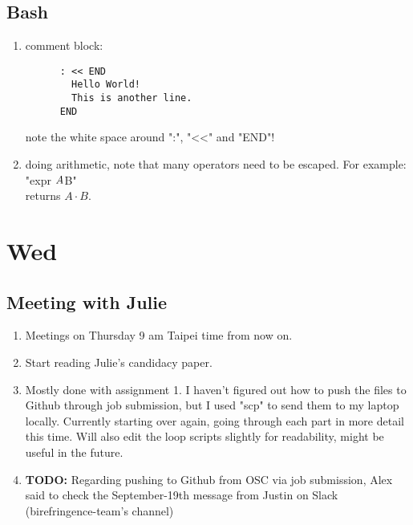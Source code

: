 \documentclass[12pt,letterpaper]{article}
\begin{document}
\subsection{Bash}
\begin{enumerate}
  \item comment block:
    \begin{verbatim}
      : << END
        Hello World!
        This is another line.
      END
    \end{verbatim}
    note the white space around ":", "<<" and "END"!

  \item doing arithmetic, note that many operators need to be escaped. For example:\\
    "expr $A \* $B"\\
    returns $A\cdot B$.
    
\end{enumerate}


\section{Wed}
\subsection{Meeting with Julie}
\begin{enumerate}
  \item Meetings on Thursday 9 am Taipei time from now on.
  \item Start reading Julie's candidacy paper.
  \item Mostly done with assignment 1. I haven't figured out how to push the files
    to Github through job submission, but I used "scp" to send them to my laptop
    locally. Currently starting over again, going through each part in more detail
    this time. Will also edit the loop scripts slightly for readability, might be 
    useful in the future.
  \item \textbf{TODO:} 
    Regarding pushing to Github from OSC via job submission,
    Alex said to check the September-19th message from Justin on Slack 
    (birefringence-team's channel)
\end{enumerate}
\end{document}
